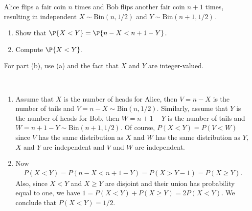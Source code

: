 
\setcounter{theorem}{11}
\begin{exercise}[BH.3.25]
  Alice flips a fair coin $n$ times and Bob flips another fair coin $n + 1$ times, resulting in independent $X \sim \text{Bin}(n, 1/2)$ and $Y \sim  \text{Bin}(n+1, 1/2)$.
	\begin{enumerate}
		\item Show that $\P{X < Y} = \P{n - X < n + 1 - Y}$.
		\item Compute $\P{X < Y}$.
	\end{enumerate}
\begin{hint}
	For part (b), use (a) and the fact that $X$ and $Y$ are integer-valued.
\end{hint}
\begin{solution}~
	\begin{enumerate}
	    \item Assume that $X$ is the number of heads for Alice, then $V=n-X$ is the number of tails and $V=n-X\sim \text{Bin}(n,1/2)$. Similarly, assume that $Y$ is the number of heads for Bob, then $W=n+1-Y$ is the number of tails and $W=n+1-Y\sim \text{Bin}(n+1,1/2)$. Of course, $P(X<Y)=P(V<W)$ since $V$ has the same distribution as $X$ and $W$ has the same distribution as $Y$, $X$ and $Y$ are independent and $V$ and $W$ are independent.
        \item Now
        \begin{align*}
        	P(X<Y) = P(n-X<n+1-Y) = P(X>Y-1) = P(X\geq Y).
        \end{align*}
        Also, since $X<Y$ and $X\geq Y$ are disjoint and their union has probability equal to one, we have $1=P(X<Y) + P(X\geq Y) = 2P(X<Y)$. We conclude that $P(X<Y)=1/2$. 
	\end{enumerate}
\end{solution}
\end{exercise}


